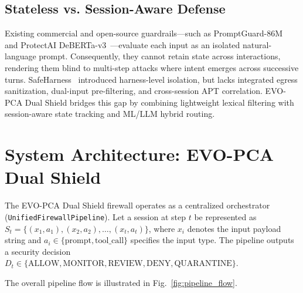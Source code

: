 \documentclass[conference]{IEEEtran}
\begin{document}
\subsection{Stateless vs. Session-Aware Defense}
Existing commercial and open-source guardrails—such as PromptGuard-86M~\cite{llamafirewall2024} and ProtectAI DeBERTa-v3~\cite{protectai2024}—evaluate each input as an isolated natural-language prompt. Consequently, they cannot retain state across interactions, rendering them blind to multi-step attacks where intent emerges across successive turns. SafeHarness~\cite{liu2024safeharness} introduced harness-level isolation, but lacks integrated egress sanitization, dual-input pre-filtering, and cross-session APT correlation. EVO-PCA Dual Shield bridges this gap by combining lightweight lexical filtering with session-aware state tracking and ML/LLM hybrid routing.

\section{System Architecture: EVO-PCA Dual Shield}
The EVO-PCA Dual Shield firewall operates as a centralized orchestrator (\texttt{UnifiedFirewallPipeline}). Let a session at step $t$ be represented as $S_t = \{(x_1, a_1), (x_2, a_2), \dots, (x_t, a_t)\}$, where $x_i$ denotes the input payload string and $a_i \in \{\text{prompt}, \text{tool\_call}\}$ specifies the input type. The pipeline outputs a security decision $D_t \in \{\text{ALLOW}, \text{MONITOR}, \text{REVIEW}, \text{DENY}, \text{QUARANTINE}\}$.

The overall pipeline flow is illustrated in Fig.~\ref{fig:pipeline_flow}.
\end{document}
